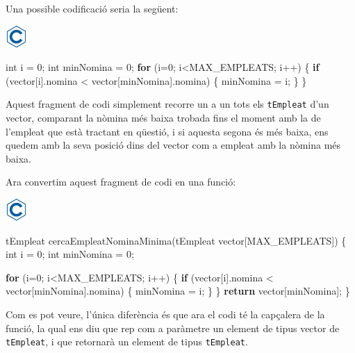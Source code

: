 \documentclass[
]{book}
\newenvironment{Shaded}{\begin{snugshade}}{\end{snugshade}}
\newcommand{\ControlFlowTok}[1]{\textcolor[rgb]{0.13,0.29,0.53}{\textbf{#1}}}
\newcommand{\DataTypeTok}[1]{\textcolor[rgb]{0.13,0.29,0.53}{#1}}
\newcommand{\DecValTok}[1]{\textcolor[rgb]{0.00,0.00,0.81}{#1}}
\newcommand{\NormalTok}[1]{#1}
\begin{document}
Una possible codificació seria la següent:

\includegraphics{./img/c.png}

\begin{Shaded}
\begin{Highlighting}[]
\DataTypeTok{int}\NormalTok{ i = }\DecValTok{0}\NormalTok{; }
\DataTypeTok{int}\NormalTok{ minNomina = }\DecValTok{0}\NormalTok{;}
\ControlFlowTok{for}\NormalTok{ (i=}\DecValTok{0}\NormalTok{; i\textless{}MAX\_EMPLEATS; i++) \{}
    \ControlFlowTok{if}\NormalTok{ (vector[i].nomina \textless{} vector[minNomina].nomina) \{}
\NormalTok{        minNomina = i;}
\NormalTok{    \}}
\NormalTok{\}}
\end{Highlighting}
\end{Shaded}

Aquest fragment de codi simplement recorre un a un tots els \texttt{tEmpleat} d'un vector, comparant la nòmina més baixa trobada fins el moment amb la de l'empleat que està tractant en qüestió, i si aquesta segona és més baixa, ens quedem amb la seva posició dins del vector com a empleat amb la nòmina més baixa.

Ara convertim aquest fragment de codi en una funció:

\includegraphics{./img/c.png}

\begin{Shaded}
\begin{Highlighting}[]
\NormalTok{tEmpleat cercaEmpleatNominaMinima(tEmpleat vector[MAX\_EMPLEATS]) \{}
    \DataTypeTok{int}\NormalTok{ i = }\DecValTok{0}\NormalTok{; }
    \DataTypeTok{int}\NormalTok{ minNomina = }\DecValTok{0}\NormalTok{;}

    \ControlFlowTok{for}\NormalTok{ (i=}\DecValTok{0}\NormalTok{; i\textless{}MAX\_EMPLEATS; i++) \{}
        \ControlFlowTok{if}\NormalTok{ (vector[i].nomina \textless{} vector[minNomina].nomina) \{}
\NormalTok{            minNomina = i;}
\NormalTok{        \}}
\NormalTok{    \}}
    \ControlFlowTok{return}\NormalTok{ vector[minNomina];}
\NormalTok{\}}
\end{Highlighting}
\end{Shaded}

Com es pot veure, l'única diferència és que ara el codi té la capçalera de la funció, la qual ens diu que rep com a paràmetre un element de tipus vector de \texttt{tEmpleat}, i que retornarà un element de tipus \texttt{tEmpleat}.
\end{document}
